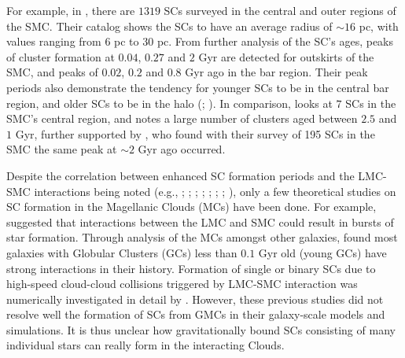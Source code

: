\documentclass[fleqn,usenatbib]{mnras}
\begin{document}
For example, in \cite{11Bitsakis_et_al2018}, there are $1319$ SCs surveyed in the central and outer regions of the SMC. Their catalog shows the SCs to have an average radius of ${\sim}16$ pc, with values ranging from $6$ pc to $30$ pc. From further analysis of the SC's ages, peaks of cluster formation at $0.04$, $0.27$ and $2$ Gyr are detected for outskirts of the SMC, and peaks of $0.02$, $0.2$ and $0.8$ Gyr ago in the bar region. Their peak periods also demonstrate the tendency for younger SCs to be in the central bar region, and older SCs to be in the halo (\citealt{1Rafelski_Zaritsky2005}; \citealt{39Nayak_et_al2018}). In comparison, \cite{64Piatti_et_al2008} looks at $7$ SCs in the SMC's central region, and notes a large number of clusters aged between $2.5$ and $1$ Gyr, further supported by \cite{1Rafelski_Zaritsky2005}, who found with their survey of 195 SCs in the SMC the same peak at ${\sim}2$ Gyr ago occurred.


Despite the correlation between enhanced SC formation periods and the LMC-SMC interactions being noted
(e.g., \citealt{27Grebel_et_al1999}; \citealt{3Parmentier_de_Grijs_Gilmore2003}; \citealt{1Rafelski_Zaritsky2005}; \citealt{16Chiosi_et_al2006}; \citealt{40Glatt_Grebel_Koch2010}; \citealt{37Maji_et_al2017}; \citealt{11Bitsakis_et_al2018}; \citealt{39Nayak_et_al2018}), only a few theoretical studies on SC formation in the Magellanic Clouds (MCs) have been done. For example, \cite{78Murai_Fujimoto1980} suggested that interactions between the LMC and SMC could result in bursts of star formation. Through analysis of the MCs amongst other galaxies, \cite{73Kumai_Basu_Fujimoto1993} found most galaxies with Globular Clusters (GCs) less than $0.1$ Gyr old (young GCs) have strong interactions in their history. Formation of single or binary SCs due to high-speed cloud-cloud collisions triggered by LMC-SMC interaction was numerically investigated in detail by \cite{79Bekki_et_al2004}. However, these previous studies did not resolve well the formation of SCs from GMCs in their galaxy-scale models and simulations. It is thus unclear how gravitationally bound SCs consisting of many individual stars can really form in the interacting Clouds.
\end{document}
